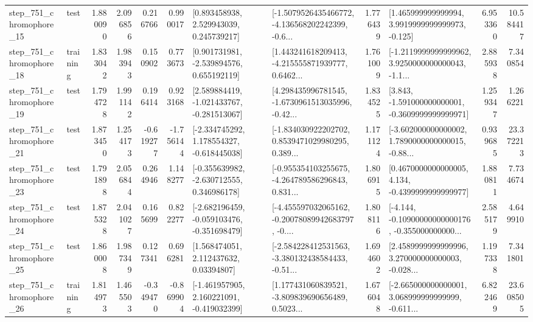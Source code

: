 \begin{tabular}{llrrrrllrlrr}
  step\_751\_chromophore\_15 &      test &      1.880090 &    2.096856 &      0.216766 &  0.990017 &     [0.893458938, 2.529943039, 0.245739217] &  [-1.5079526435466772, -4.136568202242399, -0.6... &       1.776439 &    [1.465999999999994, 3.9919999999999973, -0.125] &            6.953360 &         10.584417 \\
  step\_751\_chromophore\_18 &  training &      1.833042 &    1.983943 &      0.150902 &  0.773673 &    [0.901731981, -2.539894576, 0.655192119] &  [1.443241618209413, -4.215555871939777, 0.6462... &       1.761009 &  [-1.2119999999999962, 3.9250000000000043, -1.1... &            2.885938 &          7.340854 \\
  step\_751\_chromophore\_19 &      test &      1.794728 &    1.991142 &      0.196414 &  0.923168 &   [2.589884419, -1.021433767, -0.281513067] &  [4.298435996781545, -1.6730961513035996, -0.42... &       1.834525 &   [3.843, -1.591000000000001, -0.3609999999999971] &            1.259347 &          1.266221 \\
  step\_751\_chromophore\_21 &      test &      1.873450 &    1.254173 &     -0.619277 & -1.756144 &   [-2.334745292, 1.178554327, -0.618445038] &  [-1.834030922202702, 0.8539471029980295, 0.389... &       1.171124 &  [-3.602000000000002, 1.7890000000000015, -0.88... &            0.939685 &         23.372213 \\
  step\_751\_chromophore\_23 &      test &      1.791898 &    2.056844 &      0.264946 &  1.148277 &   [-0.355639982, -2.630712555, 0.346986178] &  [-0.955354103255675, -4.264789586296843, 0.831... &       1.806915 &   [0.4670000000000005, 4.134, -0.4399999999999977] &            1.880811 &          7.734674 \\
  step\_751\_chromophore\_24 &      test &      1.875328 &    2.041027 &      0.165699 &  0.822277 &  [-2.682196459, -0.059103476, -0.351698479] &  [-4.455597032065162, -0.20078089942683797, -0.... &       1.808116 &  [-4.144, -0.10900000000000176, -0.355000000000... &            2.585179 &          4.649910 \\
  step\_751\_chromophore\_25 &      test &      1.860008 &    1.987349 &      0.127341 &  0.696281 &      [1.568474051, 2.112437632, 0.03394807] &  [-2.584228412531563, -3.380132438584433, -0.51... &       1.694602 &  [2.4589999999999996, 3.270000000000003, -0.028... &            1.197338 &          7.341801 \\
  step\_751\_chromophore\_26 &  training &      1.814973 &    1.465503 &     -0.349470 & -0.869904 &   [-1.461957905, 2.160221091, -0.419032399] &  [1.177431060839521, -3.809839690656489, 0.5023... &       1.676048 &  [-2.665000000000001, 3.068999999999999, -0.611... &            6.822469 &         23.608505 \\

\end{tabular}
